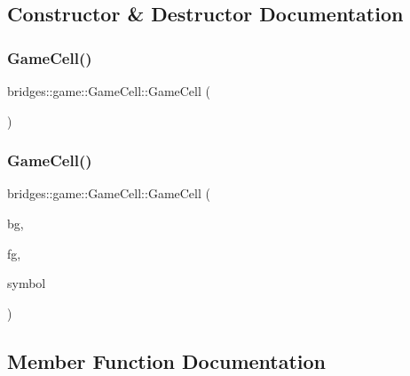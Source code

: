 \subsection{Constructor \& Destructor Documentation}
\mbox{\label{classbridges_1_1game_1_1_game_cell_a750114853f2f0f7519cb663352230868}} 
\subsubsection{\texorpdfstring{GameCell()}{GameCell()}\hspace{0.1cm}{\footnotesize\ttfamily [1/2]}}
{\footnotesize\ttfamily bridges\+::game\+::\+Game\+Cell\+::\+Game\+Cell (\begin{DoxyParamCaption}{ }\end{DoxyParamCaption})\hspace{0.3cm}{\ttfamily [inline]}}

\mbox{\label{classbridges_1_1game_1_1_game_cell_a743b618fc8553aa9aac33ddc3bb65a79}} 
\subsubsection{\texorpdfstring{GameCell()}{GameCell()}\hspace{0.1cm}{\footnotesize\ttfamily [2/2]}}
{\footnotesize\ttfamily bridges\+::game\+::\+Game\+Cell\+::\+Game\+Cell (\begin{DoxyParamCaption}\item[{\mbox{\hyperlink{namespacebridges_1_1game_afaa832a4322b25b6a4ebfba832f10f26}{Named\+Color}}}]{bg,  }\item[{\mbox{\hyperlink{namespacebridges_1_1game_afaa832a4322b25b6a4ebfba832f10f26}{Named\+Color}}}]{fg,  }\item[{\mbox{\hyperlink{namespacebridges_1_1game_ab9a19c7ab6e2ebac2f95180e21733487}{Named\+Symbol}}}]{symbol }\end{DoxyParamCaption})\hspace{0.3cm}{\ttfamily [inline]}}



\subsection{Member Function Documentation}
\mbox{\label{classbridges_1_1game_1_1_game_cell_abfe53785cb331ee73455ef4f7c2f1ba6}} 
